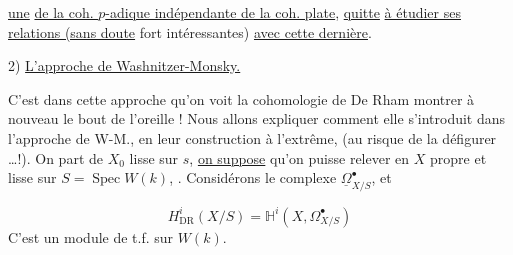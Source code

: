 
\uline{une}  \uline{de la coh. $p$-adique indépendante de la coh. plate}, \uline{quitte}  \uline{à étudier ses relations (sans doute} fort intéressantes) \uline{avec cette dernière}.

2) \uline{L'approche de Washnitzer-Monsky.}

C'est dans cette approche qu'on voit la cohomologie de De Rham  montrer à nouveau le bout de l'oreille ! Nous allons expliquer  comment elle s'introduit dans l'approche de W-M., en  leur construction à l'extrême, (au risque de la défigurer \ldots !). On part de $X_0$  lisse sur $s$, \uline{on suppose}  qu'on puisse relever en $X$  propre et lisse sur $S=\operatorname{Spec}W(k)$, . Considérons le complexe $\underline{\Omega}_{X/S}^{\bullet}$, et


\[
\boxed{H^i_{\mathrm{DR}}(X/S)=\mathbb H^i(X,\Omega^\bullet_{X/S})}
\]
C'est un module de t.f. sur $W(k)$.

